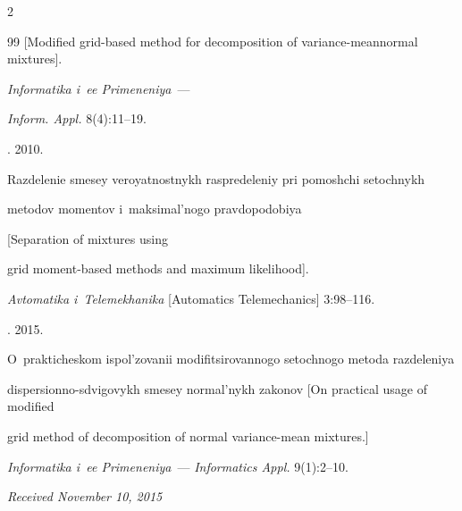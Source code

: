 \begin{multicols}{2}
{{\begin{thebibliography}{99}
[Modified grid-based method for decomposition of variance-mean\linebreak normal mixtures]. 


\textit{Informatika i~ee Primeneniya}~---


\textit{Inform. Appl.} 8(4):11--19.







. 2010.


{Razdelenie smesey veroyatnostnykh raspredeleniy pri pomoshchi setochnykh 


metodov momentov i~maksimal'nogo pravdopodobiya} [Separation of mixtures using 


grid moment-based methods and maximum likelihood].


\textit{Avtomatika i~Telemekhanika} [Automatics Telemechanics] 3:98--116.







. 2015.


O~prak\-ti\-che\-skom ispol'zovanii modifitsirovannogo setochnogo metoda razdeleniya 


dispersionno-sdvigovykh smesey normal'nykh zakonov [On practical usage of modified 


grid method of decomposition of normal variance-mean mixtures.] 


\textit{Informatika i~ee Primeneniya}~--- \textit{Informatics Appl.} 9(1):2--10.


\end{thebibliography}





 }


 }





\end{multicols}





\vspace*{-3pt}





\hfill{\small\textit{Received November 10, 2015}}





